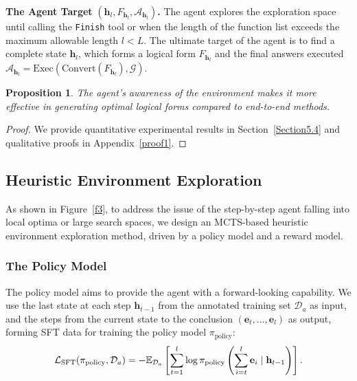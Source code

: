 \documentclass{article}
\theoremstyle{plain}
\newtheorem{proposition}[theorem]{Proposition}
\theoremstyle{definition}
\theoremstyle{remark}
\begin{document}
\textbf{The Agent Target} $(\mathbf{h}_l,F_{\mathbf{h}_l},\mathcal{A}_{\mathbf{h}_l})$\textbf{.} 
The agent explores the exploration space until calling the \texttt{Finish} tool or when the length of the function list exceeds the maximum allowable length $l<L$. The ultimate target of the agent is to find a complete state $\mathbf{h}_l$, which forms a logical form $F_{\mathbf{h}_l}$ and the final answers executed $\mathcal{A}_{\mathbf{h}_l}=\text{Exec}(\text{Convert}(F_{\mathbf{h}_l}),\mathcal{G})$.

\begin{proposition}
The agent's awareness of the environment makes it more effective in generating optimal logical forms compared to end-to-end methods.
\end{proposition}
\begin{proof} 
We provide quantitative experimental results in Section~\ref{Section5.4} and qualitative proofs in Appendix~\ref{proof1}.
\end{proof}

\subsection{Heuristic Environment Exploration}
\label{Section3.2}
As shown in Figure~\ref{f3}, to address the issue of the step-by-step agent falling into local optima or large search spaces, we design an MCTS-based heuristic environment exploration method, driven by a policy model and a reward model.

\subsubsection{The Policy Model}
The policy model aims to provide the agent with a forward-looking capability.
We use the last state at each step $\mathbf{h}_{t-1}$ from the annotated training set $\mathcal{D}_a$ as input, and the steps from the current state to the conclusion $(\mathbf{e}_t,...,\mathbf{e}_l)$ as output, forming SFT data for training the policy model $\pi_{\text{policy}}$: 
\begin{equation}
\small
    \mathcal{L}_{\text{SFT}}(\pi_{\text{policy}}, \mathcal{D}_a) = - \mathbb{E}_{\mathcal{D}_a} \left[ \sum_{t=1}^{l} \log \pi_{\text{policy}} \left(\sum_{i=t}^{l}\mathbf{e}_i \mid \mathbf{h}_{t-1}\right) \right].
\end{equation}
\end{document}
